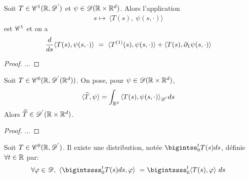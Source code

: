\documentclass[french,a4paper,10pt]{article}
\begin{document}
            \begin{proposition}\label{prop:2.2.7}
                Soit $T \in \mathscr{C}^1(\mathbb{R},\mathscr{D^{'}})$ et $\psi \in \mathscr{D}(\mathbb{R} \times \mathbb{R}^d)$. Alors l'application
                \begin{equation*}
                    \begin{aligned}
                        s \longmapsto \ {\langle T(s),\ \psi(s,\cdot) \rangle}
                    \end{aligned}
                \end{equation*}
                est $\mathscr{C}^1$ et on a 
                \begin{equation*}
                    \begin{aligned}
                        \frac{d}{ds}{\langle T(s),\psi(s,\cdot) \rangle} \ = \ {\langle T^{(1)}(s),\psi(s,\cdot)\rangle} + {\langle T(s),\mathop{}\!{\partial}_1 \psi(s,\cdot)\rangle}
                    \end{aligned}
                \end{equation*}
            \end{proposition}

            \begin{proof}
                ...
            \end{proof}

            \begin{proposition}\label{prop:2.2.8}
                Soit $T \in \mathscr{C}^0(\mathbb{R},\mathscr{D^{'}}(\mathbb{R}^d))$. On pose, pour $\psi \in \mathscr{D}(\mathbb{R} \times \mathbb{R}^d)$,
                \begin{equation*}
                    \begin{aligned}
                        {\langle \widetilde{T},\psi\rangle} = \int_{\mathbb{R}^d} {\langle T(s),\psi(s,\cdot) \rangle}_{\mathscr{D^{'}}} ds
                    \end{aligned}
                \end{equation*}
                Alors $\widetilde{T} \in \mathscr{D^{'}}(\mathbb{R} \times \mathbb{R}^d)$.
            \end{proposition}

            \begin{proof}
                ...
            \end{proof}

            \begin{proposition}\label{prop:2.2.9}
                Soit $T \in \mathscr{C}^0(\mathbb{R},\mathscr{D^{'}})$. Il existe une distribution, notée $\bigintss_0^t T(s)ds$, définie $\forall t \in \mathbb{R}$ par:
                \begin{equation*}
                    \begin{aligned}
                        \forall \vphi \in \D, \ {\langle \bigintssss_0^t T(s)ds,\vphi\rangle} \ = \bigintssss_0^t {\langle T(s),\vphi\rangle}\ ds
                    \end{aligned}
                \end{equation*}
            \end{proposition}
\end{document}
